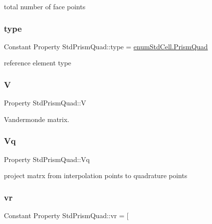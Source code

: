 total number of face points 

\mbox{\label{class_std_prism_quad_a442c2455623d7488a3313b712e0cc8f4}} 
\subsubsection{\texorpdfstring{type}{type}}
{\footnotesize\ttfamily Constant Property Std\+Prism\+Quad\+::type = \hyperlink{classenum_std_cell_ac4c2fa4e189e76e103f3ff9b1d19b9e7aeed411017d3367dd2c36b851be8666ea}{enum\+Std\+Cell.\+Prism\+Quad}}



reference element type 

\mbox{\label{class_std_prism_quad_adbe346a24b9a20a37713d9c856e2db39}} 
\subsubsection{\texorpdfstring{V}{V}}
{\footnotesize\ttfamily Property Std\+Prism\+Quad\+::V\hspace{0.3cm}{\ttfamily [protected]}}



Vandermonde matrix. 

\mbox{\label{class_std_prism_quad_ac287bfdad58c5b6e217e27f14b26eed4}} 
\subsubsection{\texorpdfstring{Vq}{Vq}}
{\footnotesize\ttfamily Property Std\+Prism\+Quad\+::\+Vq\hspace{0.3cm}{\ttfamily [protected]}}



project matrx from interpolation points to quadrature points 

\mbox{\label{class_std_prism_quad_adabf544f965c2c209ad025e0aa49f6fe}} 
\subsubsection{\texorpdfstring{vr}{vr}}
{\footnotesize\ttfamily Constant Property Std\+Prism\+Quad\+::vr = \mbox{[}}



